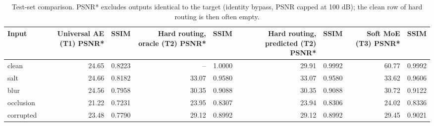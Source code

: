 \begin{table}[t]
\centering
\caption{Test-set comparison. PSNR* excludes outputs identical to the target (identity bypass, PSNR capped at 100 dB); the clean row of hard routing is then often empty.}
\label{tab:comparison_by_type}
\begin{tabular}{lrrrrrrrr}
\toprule
Input & Universal AE (T1) PSNR* & SSIM & Hard routing, oracle (T2) PSNR* & SSIM & Hard routing, predicted (T2) PSNR* & SSIM & Soft MoE (T3) PSNR* & SSIM \\
\midrule
clean & 24.65 & 0.8223 & -- & 1.0000 & 29.91 & 0.9992 & 60.77 & 0.9992 \\
salt & 24.66 & 0.8182 & 33.07 & 0.9580 & 33.07 & 0.9580 & 33.62 & 0.9606 \\
blur & 24.56 & 0.7958 & 30.35 & 0.9088 & 30.35 & 0.9088 & 30.72 & 0.9122 \\
occlusion & 21.22 & 0.7231 & 23.95 & 0.8307 & 23.94 & 0.8306 & 24.02 & 0.8336 \\
corrupted & 23.48 & 0.7790 & 29.12 & 0.8992 & 29.12 & 0.8992 & 29.45 & 0.9021 \\
\bottomrule
\end{tabular}
\end{table}
